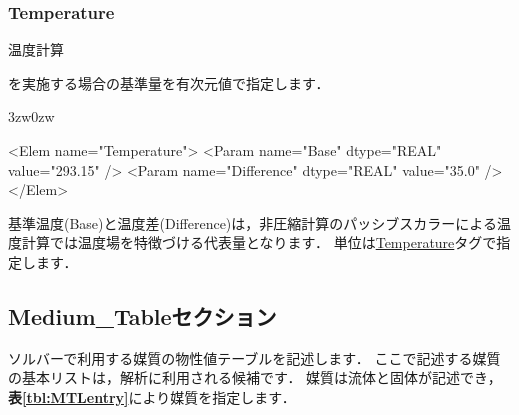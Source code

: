 \subsubsection{Temperature}

\hypertarget{tgt:temperature}{温度計算}を実施する場合の基準量を有次元値で指定します．

\begin{indentation}{3zw}{0zw}

{\small
\begin{program}
<Elem name="Temperature">
  <Param name="Base"       dtype="REAL"   value="293.15" />
  <Param name="Difference" dtype="REAL"   value="35.0" />
</Elem>
\end{program}
}

基準温度(Base)と温度差(Difference)は，非圧縮計算のパッシブスカラーによる温度計算では温度場を特徴づける代表量となります．
単位は\hyperlink{tgt:unit}{Temperature}タグで指定します．

\end{indentation}



\pagebreak
\subsection{Medium\_Tableセクション}

ソルバーで利用する媒質の\hypertarget{tgt:medium_table}{物性値テーブル}を記述します．
ここで記述する媒質の基本リストは，解析に利用される候補です．
媒質は流体と固体が記述でき，\textbf{表\ref{tbl:MTLentry}}により媒質を指定します．

